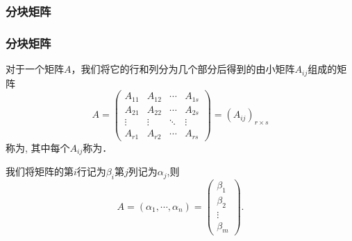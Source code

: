 \subsubsection{分块矩阵}
\begin{frame}\frametitle{分块矩阵}
\begin{definition}[分块矩阵]
对于一个矩阵$A$，我们将它的行和列分为几个部分后得到的由小矩阵$A_{ij}$组成的矩阵
\[ A = \left(\begin{array}{cccc}
A_{11} & A_{12} & \cdots & A_{1 s}\\
A_{21} & A_{22} & \cdots & A_{2 s}\\
\vdots & \vdots & \ddots & \vdots\\
A_{r 1} & A_{r 2} & \cdots & A_{rs}
\end{array}\right) = (A_{ij})_{r \times s} \]
称为, 其中每个$A_{ij}$称为．
\end{definition}
\pp
\begin{example}
我们将矩阵的第$i$行记为$\beta_i$第$j$列记为$\alpha_j$,则
\[A=(\alpha_1,\cdots,\alpha_n)=\begin{pmatrix}\beta_1\\\beta_2\\\vdots\\\beta_m\end{pmatrix}.\]
\end{example}
\end{frame}





